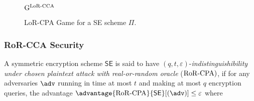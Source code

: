 \begin{figure}[h]
\centering
\begin{codeframe}[colback = white, width=9.75cm, height=6.5cm]{$\mathrm{G}^{\mathrm{LoR\textrm-CCA}}$}
\begin{pchstack}[space=0.5cm]
\begin{pcvstack}[space=0.3cm]

\end{pcvstack}

\begin{pcvstack}[space=0.3cm]
\end{pcvstack}

\end{pchstack}
\end{codeframe}
\caption{LoR-CPA Game for a \textsf{SE} scheme $\Pi$. }
\label{fig:lorcca-game}
\end{figure}



\subsubsection{RoR-CCA Security}
A symmetric encryption scheme  $\textsf{SE}$ is said to have $(q,t,\varepsilon)$-\textit{indistinguishibility under chosen plaintext attack with real-or-random oracle} ($\mathrm{RoR\textrm-CPA})$, if for any adversaries $\adv$ running in time at most $t$ and making at most $q$ encryption queries, the advantage $\advantage{\rorcpa}{\textsf{SE}}[(\adv)] \leq \varepsilon$ where 

